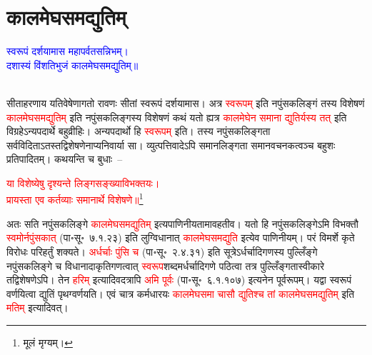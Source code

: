\section[कालमेघसमद्युतिम्]{कालमेघसमद्युतिम्‌}
\centering\textcolor{blue}{स्वरूपं दर्शयामास महापर्वतसन्निभम्।\nopagebreak\\
दशास्यं विंशतिभुजं कालमेघसमद्युतिम्॥}\nopagebreak\\
\\
\begin{sloppypar}\justifying\noindent\hspace{10mm} सीता\-हरणाय यति\-वेषेणागतो
रावणः सीतां स्वरूपं दर्शयामास। अत्र \textcolor{red}{स्वरूपम्‌} इति नपुंसकलिङ्गं तस्य विशेषणं \textcolor{red}{काल\-मेघ\-सम\-द्युतिम्‌} इति नपुंसक\-लिङ्गस्य विशेषणं कथं यतो ह्यत्र \textcolor{red}{काल\-मेघेन समाना द्युतिर्यस्य तत्‌} इति विग्रहेऽन्यपदार्थे बहुव्रीहिः। अन्य\-पदार्थो हि \textcolor{red}{स्वरूपम्‌} इति। तस्य नपुंसक\-लिङ्गता सर्व\-विदिताऽतस्तद्विशेषणेनाप्यनिवार्या सा। व्युत्पत्ति\-वादेऽपि समान\-लिङ्गता समान\-वचनकत्वञ्च बहुशः प्रतिपादितम्। कथयन्ति च बुधाः~–\end{sloppypar}
\centering\textcolor{red}{या विशेष्येषु दृश्यन्ते लिङ्गसङ्ख्याविभक्तयः।\nopagebreak\\
प्रायस्ता एव कर्तव्याः समानार्थे विशेषणे॥}\footnote{मूलं मृग्यम्।}\\
\begin{sloppypar}\justifying\noindent अतः सति नपुंसक\-लिङ्गे \textcolor{red}{कालमेघ\-समद्युतिम्‌} इत्यपाणिनीयतामावहतीव। यतो हि नपुंसक\-लिङ्गेऽमि विभक्तौ \textcolor{red}{स्वमोर्नपुंसकात्‌} (पा॰सू॰~७.१.२३) इति लुग्विधानात् \textcolor{red}{काल\-मेघ\-सम\-द्युति} इत्येव पाणिनीयम्। परं विमर्शे कृते विरोधः परिहर्तुं शक्यते। \textcolor{red}{अर्धर्चाः पुंसि च} (पा॰सू॰~२.४.३१) इति सूत्रेऽर्धर्चादि\-गणस्य पुल्लिँङ्गे नपुंसक\-लिङ्गे च विधानादाकृति\-गणत्वात् \textcolor{red}{स्वरूप}\-शब्दमर्धर्चादि\-गणे पठित्वा तत्र पुल्लिँङ्गता\-स्वीकारे तद्विशेषणेऽपि। तेन \textcolor{red}{हरिम्‌} इत्यादिवदत्रापि \textcolor{red}{अमि पूर्वः} (पा॰सू॰~६.१.१०७) इत्यनेन पूर्व\-रूपम्। यद्वा स्वरूपं वर्णयित्वा द्युतिं पृथग्वर्णयति। एवं चात्र कर्मधारयः \textcolor{red}{काल\-मेघ\-समा चासौ द्युतिश्च तां काल\-मेघ\-सम\-द्युतिम्‌} इति \textcolor{red}{मतिम्‌} इत्यादिवत्।\end{sloppypar}
